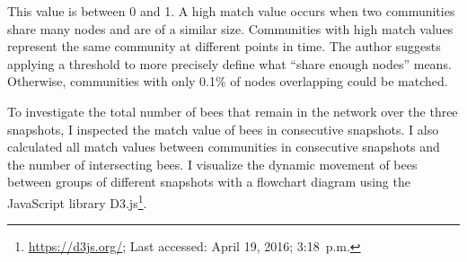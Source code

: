 This value is between 0 and 1.
A high match value occurs when two communities share many nodes and are of a similar size.
Communities with high match values represent the same community at different points in time.
The author suggests applying a threshold to more precisely define what ``share enough nodes'' means.
Otherwise, communities with only 0.1\% of nodes overlapping could be matched.

To investigate the total number of bees that remain in the network over the three snapshots, I inspected the match value of bees in consecutive snapshots.
I also calculated all match values between communities in consecutive snapshots and  the number of intersecting bees. I visualize the dynamic movement
of bees between groups of different snapshots with a flowchart diagram using the JavaScript library D3.js\footnote{\url{https://d3js.org/}; Last accessed: April 19, 2016; 3:18~p.m.}.